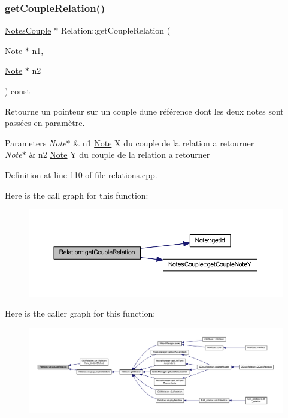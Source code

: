 \subsubsection{\texorpdfstring{get\+Couple\+Relation()}{getCoupleRelation()}}
{\footnotesize\ttfamily \hyperlink{class_notes_couple}{Notes\+Couple} $\ast$ Relation\+::get\+Couple\+Relation (\begin{DoxyParamCaption}\item[{\hyperlink{class_note}{Note} $\ast$}]{n1,  }\item[{\hyperlink{class_note}{Note} $\ast$}]{n2 }\end{DoxyParamCaption}) const}



Retourne un pointeur sur un couple d\textquotesingle{}une référence dont les deux notes sont passées en paramètre. 


\begin{DoxyParams}{Parameters}
{\em Note$\ast$} & n1 \hyperlink{class_note}{Note} X du couple de la relation a retourner \\
\hline
{\em Note$\ast$} & n2 \hyperlink{class_note}{Note} Y du couple de la relation a retourner \\
\hline
\end{DoxyParams}


Definition at line 110 of file relations.\+cpp.

Here is the call graph for this function\+:\nopagebreak
\begin{figure}[H]
\begin{center}
\leavevmode
\includegraphics[width=350pt]{class_relation_a086c39ecf396e3cfcb465fd9eea5a904_cgraph}
\end{center}
\end{figure}
Here is the caller graph for this function\+:\nopagebreak
\begin{figure}[H]
\begin{center}
\leavevmode
\includegraphics[width=350pt]{class_relation_a086c39ecf396e3cfcb465fd9eea5a904_icgraph}
\end{center}
\end{figure}
\mbox{\label{class_relation_a925c2f709d5909121d60c2ab203eb201}} 

